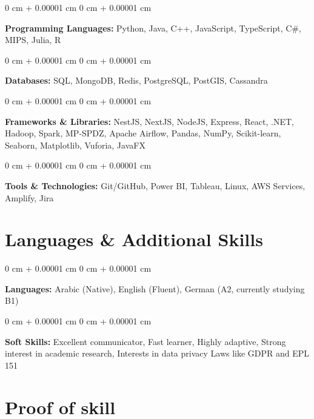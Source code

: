 \documentclass[10pt, letterpaper]{article}
\newenvironment{onecolentry}{
    \begin{adjustwidth}{
        0 cm + 0.00001 cm
    }{
        0 cm + 0.00001 cm
    }
}{
    \end{adjustwidth}
} %
\begin{document}
        \begin{onecolentry}
            \textbf{Programming Languages:} Python, Java, C++, JavaScript, TypeScript, C\#, MIPS, Julia, R
        \end{onecolentry}

        \vspace{0.2 cm}

        \begin{onecolentry}
            \textbf{Databases:} SQL, MongoDB, Redis, PostgreSQL, PostGIS, Cassandra
        \end{onecolentry}

        \vspace{0.2 cm}

        \begin{onecolentry}
            \textbf{Frameworks \& Libraries:} NestJS, NextJS, NodeJS, Express, React, .NET, Hadoop, Spark, MP-SPDZ, Apache Airflow, Pandas, NumPy, Scikit-learn, Seaborn, Matplotlib, Vuforia, JavaFX
        \end{onecolentry}

        \vspace{0.2 cm}

        \begin{onecolentry}
            \textbf{Tools \& Technologies:} Git/GitHub, Power BI, Tableau, Linux, AWS Services, Amplify, Jira
        \end{onecolentry}

    \section{Languages \& Additional Skills}

        \begin{onecolentry}
            \textbf{Languages:} Arabic (Native), English (Fluent), German (A2, currently studying B1)
        \end{onecolentry}

        \vspace{0.2 cm}

        \begin{onecolentry}
            \textbf{Soft Skills:} Excellent communicator, Fast learner, Highly adaptive, Strong interest in academic research, Interests in data privacy Laws like GDPR and EPL 151
        \end{onecolentry}

\section{Proof of skill}
\end{document}
